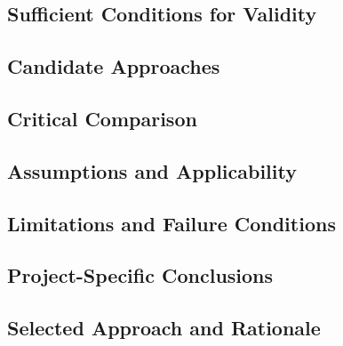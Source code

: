 \subsection{Sufficient Conditions for Validity}
\label{sec:res-mod-ibc-sufficient-conditions-validity}


\subsection{Candidate Approaches}
\label{sec:res-mod-ibc-candidate-approaches}


\subsection{Critical Comparison}
\label{sec:res-mod-ibc-critical-comparison}


\subsection{Assumptions and Applicability}
\label{sec:res-mod-ibc-assumptions}


\subsection{Limitations and Failure Conditions}
\label{sec:res-mod-ibc-limitations}


\subsection{Project-Specific Conclusions}
\label{sec:res-mod-ibc-conclusions}


\subsection{Selected Approach and Rationale}
\label{sec:res-mod-ibc-selected-approach}

